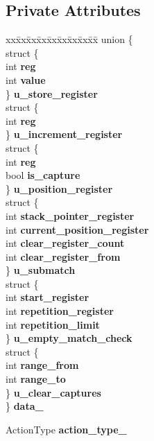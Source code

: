 \subsection*{Private Attributes}
\begin{DoxyCompactItemize}
\item 
\begin{tabbing}
xx\=xx\=xx\=xx\=xx\=xx\=xx\=xx\=xx\=\kill
union \{\\
\>struct \{\\
\>\>int {\bfseries reg}\\
\>\>int {\bfseries value}\\
\>\} {\bfseries u\_store\_register}\\
\>struct \{\\
\>\>int {\bfseries reg}\\
\>\} {\bfseries u\_increment\_register}\\
\>struct \{\\
\>\>int {\bfseries reg}\\
\>\>bool {\bfseries is\_capture}\\
\>\} {\bfseries u\_position\_register}\\
\>struct \{\\
\>\>int {\bfseries stack\_pointer\_register}\\
\>\>int {\bfseries current\_position\_register}\\
\>\>int {\bfseries clear\_register\_count}\\
\>\>int {\bfseries clear\_register\_from}\\
\>\} {\bfseries u\_submatch}\\
\>struct \{\\
\>\>int {\bfseries start\_register}\\
\>\>int {\bfseries repetition\_register}\\
\>\>int {\bfseries repetition\_limit}\\
\>\} {\bfseries u\_empty\_match\_check}\\
\>struct \{\\
\>\>int {\bfseries range\_from}\\
\>\>int {\bfseries range\_to}\\
\>\} {\bfseries u\_clear\_captures}\\
\} {\bfseries data\_}\hypertarget{classv8_1_1internal_1_1_action_node_a853e1d249c32c866e33aeada51e8eb75}{}\label{classv8_1_1internal_1_1_action_node_a853e1d249c32c866e33aeada51e8eb75}
\\

\end{tabbing}\item 
Action\+Type {\bfseries action\+\_\+type\+\_\+}\hypertarget{classv8_1_1internal_1_1_action_node_a96d572496c0ccc0ad7d17d5079cd3bb8}{}\label{classv8_1_1internal_1_1_action_node_a96d572496c0ccc0ad7d17d5079cd3bb8}

\end{DoxyCompactItemize}
